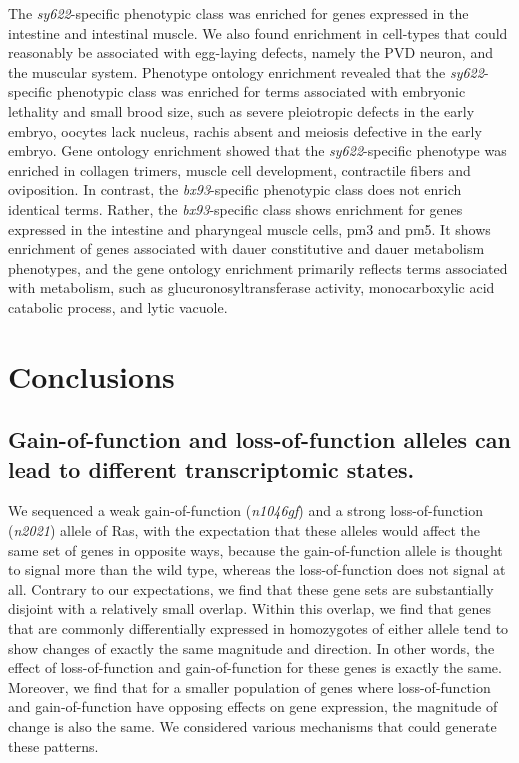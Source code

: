 \documentclass[10pt, onecolumn]{article}
\begin{document}
The \emph{sy622}-specific phenotypic class was enriched for genes expressed in
the intestine and intestinal muscle. We also found enrichment in cell-types that
could reasonably be associated with egg-laying defects, namely the PVD neuron,
and the muscular system. Phenotype ontology enrichment revealed that the
\emph{sy622}-specific phenotypic class was enriched for terms associated with
embryonic lethality and small brood size, such as severe pleiotropic defects in
the early embryo, oocytes lack nucleus, rachis absent and meiosis defective in
the early embryo. Gene ontology enrichment showed that the \emph{sy622}-specific
phenotype was enriched in collagen trimers, muscle cell development, contractile
fibers and oviposition. In contrast, the \emph{bx93}-specific phenotypic class
does not enrich identical terms. Rather, the \emph{bx93}-specific class shows
enrichment for genes expressed in the intestine and pharyngeal muscle cells, pm3
and pm5. It shows enrichment of genes associated with dauer constitutive and
dauer metabolism phenotypes, and the gene ontology enrichment primarily reflects
terms associated with metabolism, such as glucuronosyltransferase activity,
monocarboxylic acid catabolic process, and lytic vacuole.

\section*{Conclusions}
\subsection*{Gain-of-function and loss-of-function alleles can lead to different
             transcriptomic states.}
We sequenced a weak gain-of-function (\emph{n1046gf}) and a strong
loss-of-function (\emph{n2021}) allele of Ras, with the expectation that these
alleles would affect the same set of genes in opposite ways, because the
gain-of-function allele is thought to signal more than the wild type, whereas
the loss-of-function does not signal at all. Contrary to our expectations, we
find that these gene sets are substantially disjoint with a relatively small
overlap. Within this overlap, we find that genes that are commonly
differentially expressed in homozygotes of either allele tend to show changes of
exactly the same magnitude and direction. In other words, the effect of
loss-of-function and gain-of-function for these genes is exactly the same.
Moreover, we find that for a smaller population of genes where loss-of-function
and gain-of-function have opposing effects on gene expression, the magnitude of
change is also the same. We considered various mechanisms that could generate
these patterns.
\end{document}
